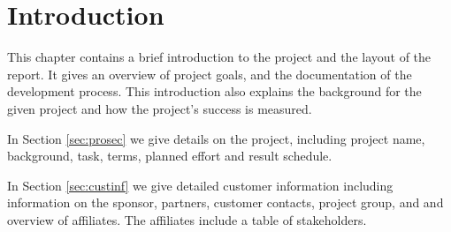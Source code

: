 \chapter{Introduction}
\label{chap:intro}
\setcounter{page}{1}
This chapter contains a brief introduction to the project and the layout of the 
report. It gives an overview of project goals, and the documentation of the development 
process. This introduction also explains the background for the given project and 
how the project's success is measured. 

In Section \ref{sec:prosec} we give details on the project, including project name, 
background, task, terms, planned effort and result schedule.

In Section \ref{sec:custinf} we give detailed customer information including
information on the sponsor, partners, customer contacts, project group, and
and overview of affiliates. The affiliates include a table of stakeholders.
  


